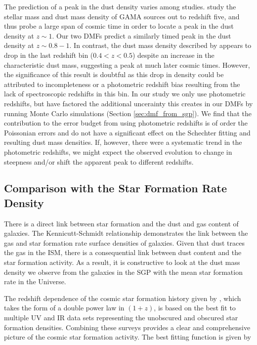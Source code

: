 The prediction of a peak in the dust density varies among studies. \citealt{Driver_2018} study the stellar mass and dust mass density of GAMA sources out to redshift five, and thus probe a large span of cosmic time in order to locate a peak in the dust density at $z \sim 1$. Our two DMFs predict a similarly timed peak in the dust density at $z \sim 0.8 - 1$. In contrast, the dust mass density described by \citealt{Dunne_2011} appears to drop in the last redshift bin ($0.4 < z < 0.5$) despite an increase in the characteristic dust mass, suggesting a peak at much later cosmic times. However, the significance of this result is doubtful as this drop in density could be attributed to incompleteness or a photometric redshift bias resulting from the lack of spectroscopic redshifts in this bin. In our study we only use photometric redshifts, but have factored the additional uncerainty this creates in our DMFs by running Monte Carlo simulations (Section \ref{sec:dmf_from_sgp}). We find that the contribution to the error budget from using photometric redshifts is of order the Poissonian errors and do not have a significant effect on the Schechter fitting and resulting dust mass densities. If, however, there were a systematic trend in the photometric redshifts, we might expect the observed evolution to change in steepness and/or shift the apparent peak to different redshifts.

\subsection{Comparison with the Star Formation Rate Density}

There is a direct link between star formation and the dust and gas content of galaxies. The Kennicutt-Schmidt relationship demonstrates the link between the gas and star formation rate surface densities of galaxies. Given that dust traces the gas in the ISM, there is a consequential link between dust content and the star formation activity. As a result, it is constructive to look at the dust mass density we observe from the galaxies in the SGP with the mean star formation rate in the Universe.

The redshift dependence of the cosmic star formation history given by \citealt{Madau_2014}, which takes the form of a double power law in $(1 + z)$, is based on the best fit to multiple UV and IR data sets representing the unobscured and obscured star formation densities. Combining these surveys provides a clear and comprehensive picture of the cosmic star formation activity. The best fitting function is given by

